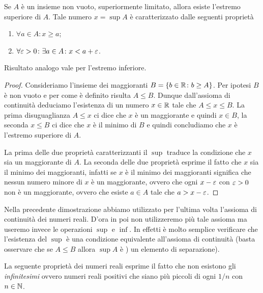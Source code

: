 \begin{theorem}
\label{th:sup}
\mymark{**}
Se $A$ è un insieme non vuoto,
superiormente limitato, allora esiste l'estremo superiore di $A$.
Tale numero $x=\sup A$ è caratterizzato dalle seguenti proprietà
\begin{enumerate}
\item $\forall a\in A\colon x \ge a$;
\item $\forall \varepsilon>0\colon \exists a\in A \colon x < a + \varepsilon$.
\end{enumerate}

Risultato analogo vale per l'estremo inferiore.
\end{theorem}
%
\begin{proof}
\mymark{*}
Consideriamo l'insieme dei maggioranti
$B = \{ b\in \mathbb R \colon b \ge A\}$.
Per ipotesi $B$ è non vuoto e per come è definito risulta $A\le B$.
Dunque dall'assioma di continuità deduciamo l'esistenza di un numero $x\in \mathbb R$
tale che $A\le x \le B$. La prima disuguaglianza $A\le x$ ci dice che $x$ è un
maggiorante e quindi $x\in B$, la seconda $x\le B$ ci dice che $x$ è il minimo
di $B$ e quindi concludiamo che $x$ è l'estremo superiore di $A$.

La prima delle due proprietà caratterizzanti il $\sup$ traduce la condizione
che $x$ sia un maggiorante di $A$. La seconda delle due proprietà esprime il
fatto che $x$ sia il minimo dei maggioranti, infatti se $x$ è il minimo
dei maggioranti significa che nessun numero minore di $x$ è un maggiorante, ovvero
che ogni $x-\varepsilon$ con $\varepsilon>0$ non è un maggiorante, ovvero
che esiste $a\in A$ tale che $a > x-\varepsilon$.
\end{proof}

Nella precedente dimostrazione abbiamo utilizzato per l'ultima volta
l'assioma di continuità dei numeri reali.
D'ora in poi non utilizzeremo più tale assioma ma useremo invece
le operazioni $\sup$ e $\inf$.
In effetti è molto semplice verificare che l'esistenza del $\sup$
è una condizione equivalente all'assioma di continuità
(basta osservare che se $A\le B$ allora $\sup A$ è )
un elemento di separazione).

La seguente proprietà dei numeri reali esprime il fatto
che non esistono gli \emph{infinitesimi} ovvero numeri reali positivi
che siano più piccoli di ogni $1/n$ con $n\in \mathbb N$.

